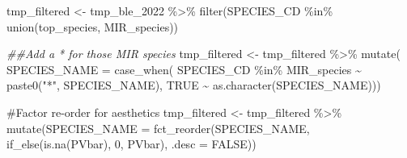 \documentclass[
]{article}
\newenvironment{Shaded}{\begin{snugshade}}{\end{snugshade}}
\newcommand{\AttributeTok}[1]{\textcolor[rgb]{0.40,0.45,0.13}{#1}}
\newcommand{\CommentTok}[1]{\textcolor[rgb]{0.37,0.37,0.37}{#1}}
\newcommand{\ConstantTok}[1]{\textcolor[rgb]{0.56,0.35,0.01}{#1}}
\newcommand{\DecValTok}[1]{\textcolor[rgb]{0.68,0.00,0.00}{#1}}
\newcommand{\DocumentationTok}[1]{\textcolor[rgb]{0.37,0.37,0.37}{\textit{#1}}}
\newcommand{\FunctionTok}[1]{\textcolor[rgb]{0.28,0.35,0.67}{#1}}
\newcommand{\NormalTok}[1]{\textcolor[rgb]{0.00,0.23,0.31}{#1}}
\newcommand{\OtherTok}[1]{\textcolor[rgb]{0.00,0.23,0.31}{#1}}
\newcommand{\SpecialCharTok}[1]{\textcolor[rgb]{0.37,0.37,0.37}{#1}}
\newcommand{\StringTok}[1]{\textcolor[rgb]{0.13,0.47,0.30}{#1}}
\begin{document}
\begin{Shaded}
\begin{Highlighting}[]
\NormalTok{tmp\_filtered }\OtherTok{\textless{}{-}}\NormalTok{ tmp\_ble\_2022 }\SpecialCharTok{\%\textgreater{}\%}
  \FunctionTok{filter}\NormalTok{(SPECIES\_CD }\SpecialCharTok{\%in\%} \FunctionTok{union}\NormalTok{(top\_species, MIR\_species)) }

\DocumentationTok{\#\#Add a * for those MIR species}
\NormalTok{tmp\_filtered }\OtherTok{\textless{}{-}}\NormalTok{ tmp\_filtered }\SpecialCharTok{\%\textgreater{}\%} \FunctionTok{mutate}\NormalTok{(}
  \AttributeTok{SPECIES\_NAME =} \FunctionTok{case\_when}\NormalTok{(}
\NormalTok{    SPECIES\_CD }\SpecialCharTok{\%in\%}\NormalTok{ MIR\_species }\SpecialCharTok{\textasciitilde{}} \FunctionTok{paste0}\NormalTok{(}\StringTok{"*"}\NormalTok{, SPECIES\_NAME),}
    \ConstantTok{TRUE} \SpecialCharTok{\textasciitilde{}} \FunctionTok{as.character}\NormalTok{(SPECIES\_NAME)))}

\CommentTok{\#Factor re{-}order for aesthetics  }
\NormalTok{tmp\_filtered }\OtherTok{\textless{}{-}}\NormalTok{ tmp\_filtered }\SpecialCharTok{\%\textgreater{}\%}
  \FunctionTok{mutate}\NormalTok{(}\AttributeTok{SPECIES\_NAME =} 
           \FunctionTok{fct\_reorder}\NormalTok{(SPECIES\_NAME, }\FunctionTok{if\_else}\NormalTok{(}\FunctionTok{is.na}\NormalTok{(PVbar), }\DecValTok{0}\NormalTok{, PVbar), }\AttributeTok{.desc =} \ConstantTok{FALSE}\NormalTok{))}


\end{Highlighting}
\end{Shaded}
\end{document}
